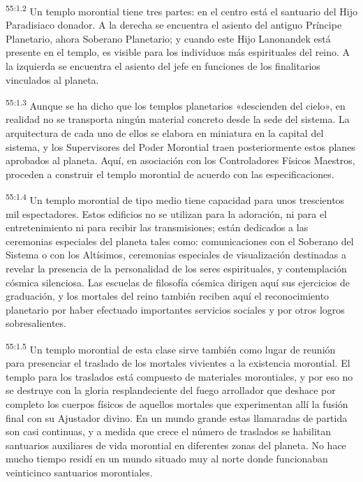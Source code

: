 \par
\textsuperscript{55:1.2} Un templo morontial tiene tres partes: en el centro está el santuario del Hijo Paradisiaco donador. A la derecha se encuentra el asiento del antiguo Príncipe Planetario, ahora Soberano Planetario; y cuando este Hijo Lanonandek está presente en el templo, es visible para los individuos más espirituales del reino. A la izquierda se encuentra el asiento del jefe en funciones de los finalitarios vinculados al planeta.

\par
\textsuperscript{55:1.3} Aunque se ha dicho que los templos planetarios «descienden del cielo», en realidad no se transporta ningún material concreto desde la sede del sistema. La arquitectura de cada uno de ellos se elabora en miniatura en la capital del sistema, y los Supervisores del Poder Morontial traen posteriormente estos planes aprobados al planeta. Aquí, en asociación con los Controladores Físicos Maestros, proceden a construir el templo morontial de acuerdo con las especificaciones.

\par
\textsuperscript{55:1.4} Un templo morontial de tipo medio tiene capacidad para unos trescientos mil espectadores. Estos edificios no se utilizan para la adoración, ni para el entretenimiento ni para recibir las transmisiones; están dedicados a las ceremonias especiales del planeta tales como: comunicaciones con el Soberano del Sistema o con los Altísimos, ceremonias especiales de visualización destinadas a revelar la presencia de la personalidad de los seres espirituales, y contemplación cósmica silenciosa. Las escuelas de filosofía cósmica dirigen aquí sus ejercicios de graduación, y los mortales del reino también reciben aquí el reconocimiento planetario por haber efectuado importantes servicios sociales y por otros logros sobresalientes.

\par
\textsuperscript{55:1.5} Un templo morontial de esta clase sirve también como lugar de reunión para presenciar el traslado de los mortales vivientes a la existencia morontial. El templo para los traslados está compuesto de materiales morontiales, y por eso no se destruye con la gloria resplandeciente del fuego arrollador que deshace por completo los cuerpos físicos de aquellos mortales que experimentan allí la fusión final con su Ajustador divino. En un mundo grande estas llamaradas de partida son casi continuas, y a medida que crece el número de traslados se habilitan santuarios auxiliares de vida morontial en diferentes zonas del planeta. No hace mucho tiempo residí en un mundo situado muy al norte donde funcionaban veinticinco santuarios morontiales.

